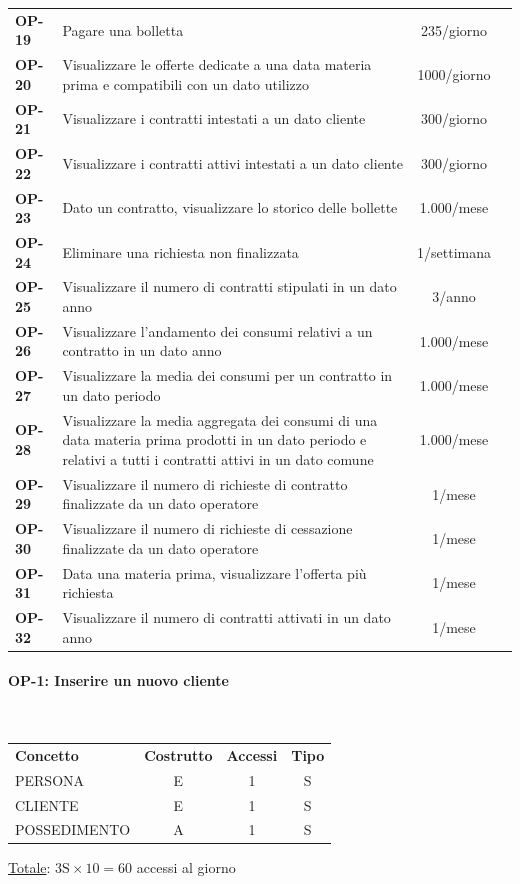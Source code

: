 \documentclass[a4paper,12pt]{report}
\begin{document}
\begin{longtable}{l p{10cm} c r}
    \textbf{OP-19} & Pagare una bolletta & 235/giorno \\
    \textbf{OP-20} & Visualizzare le offerte dedicate a una data materia prima e compatibili con un dato utilizzo & 1000/giorno \\
    \textbf{OP-21} & Visualizzare i contratti intestati a un dato cliente & 300/giorno \\
    \textbf{OP-22} & Visualizzare i contratti attivi intestati a un dato cliente & 300/giorno \\
    \textbf{OP-23} & Dato un contratto, visualizzare lo storico delle bollette & 1.000/mese \\
    \textbf{OP-24} & Eliminare una richiesta non finalizzata & 1/settimana \\
    \textbf{OP-25} & Visualizzare il numero di contratti stipulati in un dato anno & 3/anno \\
    \textbf{OP-26} & Visualizzare l'andamento dei consumi relativi a un contratto in un dato anno & 1.000/mese \\
    \textbf{OP-27} & Visualizzare la media dei consumi per un contratto in un dato periodo & 1.000/mese \\
    \textbf{OP-28} & Visualizzare la media aggregata dei consumi di una data materia prima prodotti in un dato periodo e relativi a tutti i contratti attivi in un dato comune & 1.000/mese \\
    \textbf{OP-29} & Visualizzare il numero di richieste di contratto finalizzate da un dato operatore & 1/mese \\
    \textbf{OP-30} & Visualizzare il numero di richieste di cessazione finalizzate da un dato operatore & 1/mese \\
    \textbf{OP-31} & Data una materia prima, visualizzare l'offerta più richiesta & 1/mese \\
    \textbf{OP-32} & Visualizzare il numero di contratti attivati in un dato anno & 1/mese \\
    \hline
\end{longtable}

\paragraph{OP-1: Inserire un nuovo cliente}\mbox{}\\
\begin{center}
\begin{tabular}{@{}l c  c  c@{}}
    \hline
    \textbf{Concetto} & \textbf{Costrutto} & \textbf{Accessi} & \textbf{Tipo} \\ [0.5ex]
    PERSONA & E & 1 & S \\
    CLIENTE & E & 1 & S \\
    POSSEDIMENTO & A & 1 & S \\
    \hline
\end{tabular}
\end{center}
\underline{Totale}: $3 \text{S} \times 10 = 60$ accessi al giorno 
\end{document}
